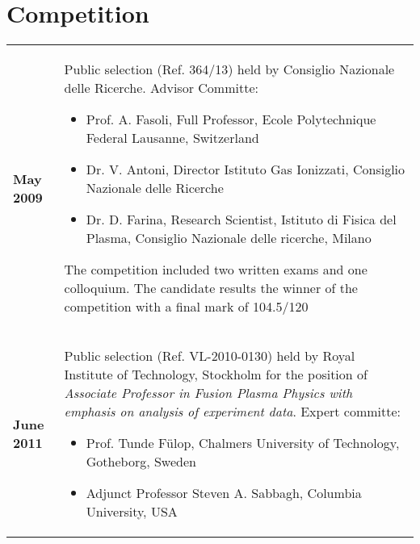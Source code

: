 \section{Competition}
\begin{tabular}{>{\bfseries}l p{15cm}}
May 2009 & Public selection (Ref. 364/13) held by Consiglio
  Nazionale delle Ricerche. Advisor Committe:
  \begin{itemize}
  \item Prof. A. Fasoli, Full Professor, Ecole Polytechnique Federal Lausanne, Switzerland
  \item Dr. V. Antoni, Director Istituto Gas Ionizzati, Consiglio Nazionale delle Ricerche
  \item Dr. D. Farina, Research Scientist, Istituto di Fisica del
    Plasma, Consiglio Nazionale delle ricerche, Milano
  \end{itemize}
  The competition included two written exams
  and one colloquium. The candidate results the winner of the
  competition with a final mark of 104.5/120 \\
June 2011 & Public selection (Ref. VL-2010-0130) held by Royal
Institute of Technology, Stockholm for the position of \emph{Associate
Professor in Fusion Plasma Physics with emphasis on analysis of
experiment data}. Expert committe:
\begin{itemize}
\item Prof. Tunde F\"ulop, Chalmers University of Technology,
  Gotheborg, Sweden 
\item Adjunct Professor Steven A. Sabbagh, Columbia University, USA
\end{itemize} 
\end{tabular}
